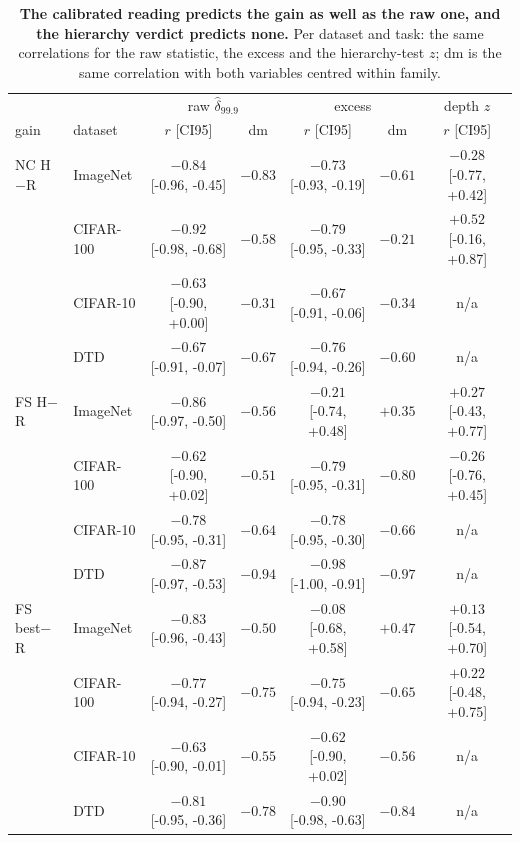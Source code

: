 \begin{table}[H]
\centering
\scriptsize
\setlength{\tabcolsep}{2.6pt}
\begingroup
\setlength{\tabcolsep}{3pt}
\begin{tabular}{llcc|cc|c}
\toprule
 & & \multicolumn{2}{c|}{raw $\hat\delta_{99.9}$} & \multicolumn{2}{c|}{excess} & depth $z$ \\
gain & dataset & $r$ [CI95] & dm & $r$ [CI95] & dm & $r$ [CI95] \\
\midrule
NC H$-$R & ImageNet & $-0.84$ [-0.96, -0.45] & $-0.83$ & $-0.73$ [-0.93, -0.19] & $-0.61$ & $-0.28$ [-0.77, +0.42] \\
 & CIFAR-100 & $-0.92$ [-0.98, -0.68] & $-0.58$ & $-0.79$ [-0.95, -0.33] & $-0.21$ & $+0.52$ [-0.16, +0.87] \\
 & CIFAR-10 & $-0.63$ [-0.90, +0.00] & $-0.31$ & $-0.67$ [-0.91, -0.06] & $-0.34$ & n/a \\
 & DTD & $-0.67$ [-0.91, -0.07] & $-0.67$ & $-0.76$ [-0.94, -0.26] & $-0.60$ & n/a \\
\midrule
FS H$-$R & ImageNet & $-0.86$ [-0.97, -0.50] & $-0.56$ & $-0.21$ [-0.74, +0.48] & $+0.35$ & $+0.27$ [-0.43, +0.77] \\
 & CIFAR-100 & $-0.62$ [-0.90, +0.02] & $-0.51$ & $-0.79$ [-0.95, -0.31] & $-0.80$ & $-0.26$ [-0.76, +0.45] \\
 & CIFAR-10 & $-0.78$ [-0.95, -0.31] & $-0.64$ & $-0.78$ [-0.95, -0.30] & $-0.66$ & n/a \\
 & DTD & $-0.87$ [-0.97, -0.53] & $-0.94$ & $-0.98$ [-1.00, -0.91] & $-0.97$ & n/a \\
\midrule
FS best$-$R & ImageNet & $-0.83$ [-0.96, -0.43] & $-0.50$ & $-0.08$ [-0.68, +0.58] & $+0.47$ & $+0.13$ [-0.54, +0.70] \\
 & CIFAR-100 & $-0.77$ [-0.94, -0.27] & $-0.75$ & $-0.75$ [-0.94, -0.23] & $-0.65$ & $+0.22$ [-0.48, +0.75] \\
 & CIFAR-10 & $-0.63$ [-0.90, -0.01] & $-0.55$ & $-0.62$ [-0.90, +0.02] & $-0.56$ & n/a \\
 & DTD & $-0.81$ [-0.95, -0.36] & $-0.78$ & $-0.90$ [-0.98, -0.63] & $-0.84$ & n/a \\
\bottomrule
\end{tabular}
\par\vspace{2pt}
\endgroup
\caption{\textbf{The calibrated reading predicts the gain as well as the raw one, and the hierarchy verdict predicts none.} Per dataset and task: the same correlations for the raw statistic, the excess and the hierarchy-test $z$; dm is the same correlation with both variables centred within family.
}
\label{tab:q9-corollary-d}
\end{table}
